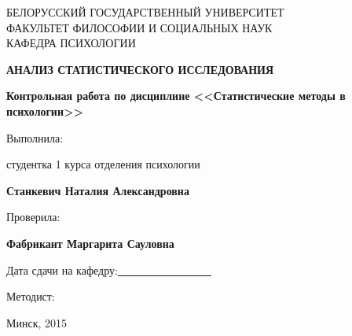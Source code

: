 \documentclass{../../common/thesisbyxetex}
\begin{document}
\begin{titlepage}
\newpage

\begin{center}
\large \uppercase{Белорусский государственный университет \\
факультет философии и социальных наук\\
кафедра психологии}
\end{center}
 
\vspace{12em}

\renewcommand{\mkgostheading}[1]{#1}

\begin{center}
\Large \uppercase{\textbf{Анализ статистического исследования}}
\end{center}

\begin{center}
\textbf{Контрольная работа по дисциплине <<Статистические методы в психологии>>}
\end{center}

\vspace{11em}
 
\begin{flushright}
Выполнила:

\vspace{0.25em}

студентка 1 курса отделения психологии

\textbf{Станкевич Наталия Александровна}

\vspace{2em}

Проверила:

\vspace{0.25em}

\textbf{Фабрикант Маргарита Сауловна}

\end{flushright}

\vspace{2em}
Дата сдачи на кафедру:\underline{~~~~~~~~~~~~~~~~~}
\vspace{0.25em}

Методист:
 
\vspace{\fill}

\begin{center}
Минск, 2015
\end{center}

\end{titlepage}
\end{document}
